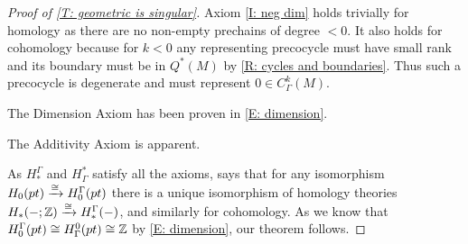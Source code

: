 \begin{proof}[Proof of \cref{T: geometric is singular}]
	Axiom \ref{I: neg dim} holds trivially for homology as there are no non-empty prechains of degree $<0$.
	It also holds for cohomology because for $k<0$ any representing precocycle must have small rank and its boundary must be in $Q^*(M)$ by \cref{R: cycles and boundaries}.
	Thus such a precocycle is degenerate and must represent $0 \in C^k_\Gamma(M)$.

	The Dimension Axiom has been proven in \cref{E: dimension}.

	The Additivity Axiom is apparent.

	As $H_*^\Gamma$ and $H^*_\Gamma$ satisfy all the axioms, \cite[Proposition 10]{Krec10b} says that for any isomorphism $H_0(pt) \xrightarrow{\cong} H^\Gamma_0(pt)$ there is a unique isomorphism of homology theories $H_*(- ;\mathbb{Z}) \xrightarrow{\cong} H_*^\Gamma(-)$, and similarly for cohomology.
	As we know that $H_0^\Gamma(pt) \cong H_\Gamma^0(pt) \cong \mathbb{Z}$ by \cref{E: dimension}, our theorem follows.
\end{proof}




